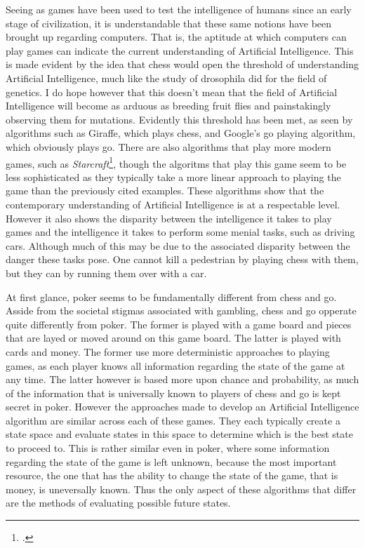 \documentclass[10pt, a4paper, twocolumn]{article} %
\begin{document}
Seeing as games have been used to test the intelligence of humans since an early stage of civilization, it is understandable that these same notions have been brought up regarding computers. That is, the aptitude at which computers can play games can indicate the current understanding of Artificial Intelligence. This is made evident by the idea that chess would open the threshold of understanding Artificial Intelligence, much like the study of drosophila did for the field of genetics\citep{Reference4}. I do hope however that this doesn't mean that the field of Artificial Intelligence will become as arduous as breeding fruit flies and painstakingly observing them for mutations. Evidently this threshold has been met, as seen by algorithms such as Giraffe\citep{Reference1}, which plays chess, and Google's go playing algorithm\citep{Reference2}, which obviously plays go. There are also algorithms that play more modern games, such as \textit{Starcraft}\footcite{Reference3}, though the algoritms that play this game seem to be less sophisticated as they typically take a more linear approach to playing the game than the previously cited examples. These algorithms show that the contemporary understanding of Artificial Intelligence is at a respectable level. However it also shows the disparity between the intelligence it takes to play games and the intelligence it takes to perform some menial tasks, such as driving cars. Although much of this may be due to the associated disparity between the danger these tasks pose. One cannot kill a pedestrian by playing chess with them, but they can by running them over with a car.

At first glance, poker seems to be fundamentally different from chess and go. Asside from the societal stigmas associated with gambling, chess and go opperate quite differently from poker. The former is played with a game board and pieces that are layed or moved around on this game board. The latter is played with cards and money. The former use more deterministic approaches to playing games, as each player knows all information regarding the state of the game at any time. The latter however is based more upon chance and probability, as much of the information that is universally known to players of chess and go is kept secret in poker. However the approaches made to develop an Artificial Intelligence algorithm are similar across each of these games. They each typically create a state space and evaluate states in this space to determine which is the best state to proceed to. This is rather similar even in poker, where some information regarding the state of the game is left unknown, because the most important resource, the one that has the ability to change the state of the game, that is money, is uneversally known. Thus the only aspect of these algorithms that differ are the methods of evaluating possible future states.
\end{document}
